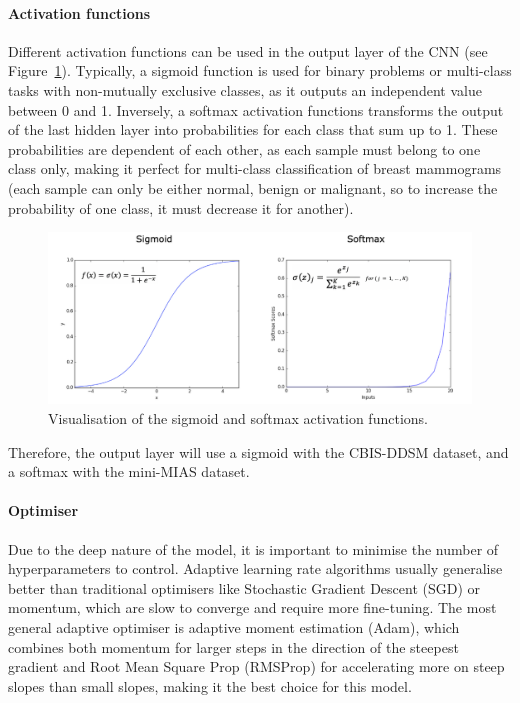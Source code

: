 \paragraph{Activation functions}

Different activation functions can be used in the output layer of the CNN (see Figure~\ref{fig:design-activation functions}). Typically, a sigmoid function is used for binary problems or multi-class tasks with non-mutually exclusive classes, as it outputs an independent value between 0 and 1. Inversely, a softmax activation functions transforms the output of the last hidden layer into probabilities for each class that sum up to 1. These probabilities are dependent of each other, as each sample must belong to one class only, making it perfect for multi-class classification of breast mammograms (each sample can only be either normal, benign or malignant, so to increase the probability of one class, it must decrease it for another).

\begin{figure}[ht]
\centerline{\includegraphics[width=1.1\textwidth]{figures/design/activation functions.png}}
\caption{\label{fig:design-activation functions}Visualisation of the sigmoid and softmax activation functions.}
\end{figure}

Therefore, the output layer will use a sigmoid with the CBIS-DDSM dataset, and a softmax with the mini-MIAS dataset.

\paragraph{Optimiser}

Due to the deep nature of the model, it is important to minimise the number of hyperparameters to control. Adaptive learning rate algorithms usually generalise better than traditional optimisers like Stochastic Gradient Descent (SGD) or momentum, which are slow to converge and require more fine-tuning. The most general adaptive optimiser is adaptive moment estimation (Adam), which combines both momentum for larger steps in the direction of the steepest gradient and Root Mean Square Prop (RMSProp) for accelerating more on steep slopes than small slopes, making it the best choice for this model.

